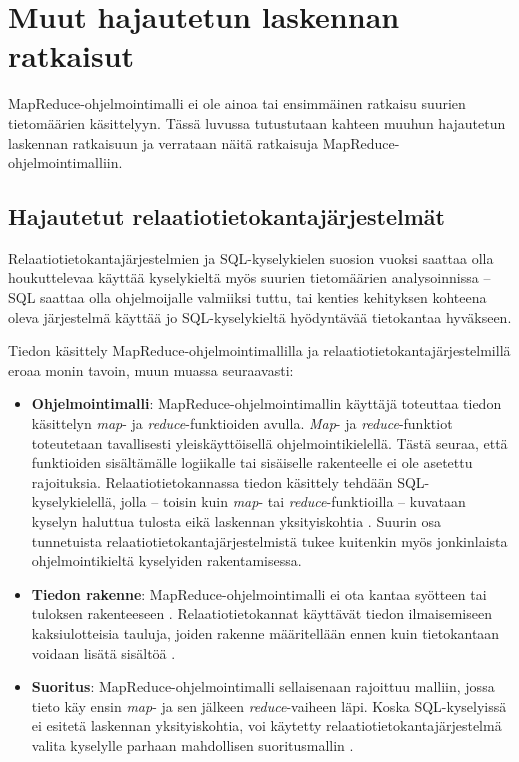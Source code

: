 \documentclass[finnish]{templates/tktltiki2}
\theoremstyle{definition}
\theoremstyle{remark}
\begin{document}
\section{Muut hajautetun laskennan
ratkaisut}\label{muut-hajautetun-laskennan-ratkaisut}

MapReduce-ohjelmointimalli ei ole ainoa tai ensimmäinen ratkaisu suurien
tietomäärien käsittelyyn. Tässä luvussa tutustutaan kahteen muuhun
hajautetun laskennan ratkaisuun ja verrataan näitä ratkaisuja
MapReduce-ohjelmointimalliin.

\subsection{Hajautetut
relaatiotietokantajärjestelmät}\label{hajautetut-relaatiotietokantajuxe4rjestelmuxe4t}

Relaatiotietokantajärjestelmien ja SQL-kyselykielen suosion vuoksi
saattaa olla houkuttelevaa käyttää kyselykieltä myös suurien
tietomäärien analysoinnissa -- SQL saattaa olla ohjelmoijalle valmiiksi
tuttu, tai kenties kehityksen kohteena oleva järjestelmä käyttää jo
SQL-kyselykieltä hyödyntävää tietokantaa hyväkseen.

Tiedon käsittely MapReduce-ohjelmointimallilla ja
relaatiotietokantajärjestelmillä eroaa monin tavoin, muun muassa
seuraavasti:

\begin{itemize}
\item
  \textbf{Ohjelmointimalli}: MapReduce-ohjelmointimallin käyttäjä
  toteuttaa tiedon käsittelyn \emph{map}- ja \emph{reduce}-funktioiden
  avulla. \emph{Map}- ja \emph{reduce}-funktiot toteutetaan tavallisesti
  yleiskäyttöisellä ohjelmointikielellä. Tästä seuraa, että funktioiden
  sisältämälle logiikalle tai sisäiselle rakenteelle ei ole asetettu
  rajoituksia. Relaatiotietokannassa tiedon käsittely tehdään
  SQL-kyselykielellä, jolla -- toisin kuin \emph{map}- tai
  \emph{reduce}-funktioilla -- kuvataan kyselyn haluttua tulosta eikä
  laskennan yksityiskohtia \cite{mapreduce-comparison}. Suurin osa
  tunnetuista relaatiotietokantajärjestelmistä tukee kuitenkin myös
  jonkinlaista ohjelmointikieltä kyselyiden rakentamisessa.
\item
  \textbf{Tiedon rakenne}: MapReduce-ohjelmointimalli ei ota kantaa
  syötteen tai tuloksen rakenteeseen \cite{mapreduce2}.
  Relaatiotietokannat käyttävät tiedon ilmaisemiseen kaksiulotteisia
  tauluja, joiden rakenne määritellään ennen kuin tietokantaan voidaan
  lisätä sisältöä \cite{mapreduce-comparison}.
\item
  \textbf{Suoritus}: MapReduce-ohjelmointimalli sellaisenaan rajoittuu
  malliin, jossa tieto käy ensin \emph{map}- ja sen jälkeen
  \emph{reduce}-vaiheen läpi. Koska SQL-kyselyissä ei esitetä laskennan
  yksityiskohtia, voi käytetty relaatiotietokantajärjestelmä valita
  kyselylle parhaan mahdollisen suoritusmallin
  \cite{mapreduce-comparison}.
\end{itemize}
\end{document}
